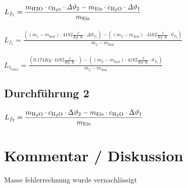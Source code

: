 \documentclass[a4 paper, 11pt]{article}
\begin{document}
$L_{f_1}= \displaystyle{\frac{m_{\rm{H2O}} \cdot c_{\rm{H_2o}} \cdot \mathit{\Delta}\vartheta_2 - m_{\rm{Eis}} \cdot c_{\rm{H_2O}} \cdot \mathit{\Delta}\vartheta_1}{m_{\rm{Eis}}}}$\\\\

$L_{f_1}=\displaystyle{\frac{\left(\left(m_1-m_{Kal}\right) \cdot 4182\frac{J}{Kg \cdot K}\cdot \Delta \vartheta_{T_1}\right)-\left(\left(m_2-m_{Kal}\right)\cdot 4182 \frac{J}{Kg \cdot K} \cdot \vartheta_{T_2}\right)}{m_2-m_{Kal}}} $\\\\

$L_{1_{max}} =\displaystyle{\frac{\left(0.174Kg \cdot 4182\frac{J}{Kg \cdot K}\cdot \right)-\left(\left(m_2-m_{Kal}\right)\cdot 4182 \frac{J}{Kg \cdot K} \cdot \vartheta_{T_2}\right)}{m_2-m_{Kal}}} $

\subsection{Durchführung 2}
$L_{f_2} = \displaystyle{\frac{m_{\rm{H_{2}O}} \cdot c_{\rm{H_{2}O}} \cdot \Delta\vartheta_2 - m_{\rm{Eis}} \cdot c_{\rm{H_2O}} \cdot \Delta\vartheta_1}{m_{\rm{Eis}}}}$
\section{Kommentar / Diskussion}

Masse fehlerrechnung wurde vernachlässigt
\end{document}
